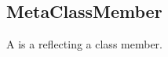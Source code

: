 \subsection{MetaClassMember}
\label{concept-MetaClassMember}

A  is a  reflecting a class member.




